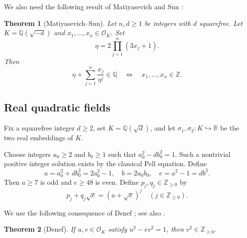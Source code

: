 \documentclass[12pt]{amsart}
\numberwithin{equation}{section}
\newtheorem{theorem}{Theorem}[section]
\theoremstyle{remark}
\theoremstyle{plain}
\newcommand{\Z}{\mathbb{Z}}
\newcommand{\Q}{\mathbb{Q}}
\newcommand{\R}{\mathbb{R}}
\newcommand{\sO}{\mathcal{O}}
\begin{document}
We also need the following result of Matiyasevich and Sun \cite[Theorem~1.2]{MS27}:
\begin{theorem}[Matiyasevich--Sun]\label{thm:MS}
Let $n,d\geq1$ be integers with $d$ squarefree. Let $K=\Q(\sqrt{-d})$ and $x_1,\ldots,x_n\in\sO_K$. Set
\[
\eta=2\prod_{j=1}^n(3x_j+1).
\]
Then
\[
\eta+\sum_{j=1}^n\frac{x_j}{\eta^j}\in\Q\quad\Longleftrightarrow\quad x_1,\ldots,x_n\in\Z.
\]
\end{theorem}

\subsection{Real quadratic fields}\label{sec:real}
Fix a squarefree integer $d\geq2$, set $K=\Q(\sqrt{d})$, and let $\sigma_1,\sigma_2:K\hookrightarrow\R$ be the two real embeddings of $K$.

Choose integers $a_0\geq2$ and $b_0\geq1$ such that $a_0^2-db_0^2=1$. Such a nontrivial positive integer solution exists by the classical Pell equation. Define
\begin{equation}\label{eq:real-ae}
a=a_0^2+db_0^2=2a_0^2-1,\quad b=2a_0b_0,\quad e=a^2-1=db^2.
\end{equation}
Then $a\geq7$ is odd and $e\geq48$ is even. Define $p_j,q_j\in\Z_{\geq0}$ by
\begin{equation*}
p_j+q_j\sqrt{e}=(a+\sqrt{e})^j\quad(j\in\Z_{\geq0}).
\end{equation*}

We use the following consequence of Denef \cite[Lemma~4]{Denef75}; see also \cite[Lemma~3.3(i)]{Sun26}.
\begin{theorem}[Denef]\label{thm:Denef}
If $u,v\in\sO_K$ satisfy $u^2-ev^2=1$, then $v^2\in\Z_{\geq0}$.
\end{theorem}
\end{document}
